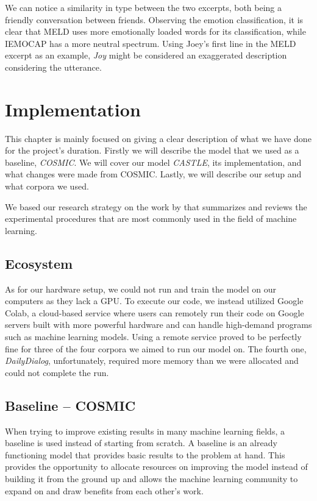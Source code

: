 \documentclass[nofilelist]{cslthse-msc}
\begin{document}
We can notice a similarity in type between the two excerpts, both being a friendly conversation between friends. Observing the emotion classification, it is clear that MELD uses more emotionally loaded words for its classification, while IEMOCAP has a more neutral spectrum. Using Joey's first line in the MELD excerpt as an example, \textit{Joy} might be considered an exaggerated description considering the utterance. 










\chapter{Implementation}
This chapter is mainly focused on giving a clear description of what we have done for the project's duration. Firstly we will describe the model that we used as a baseline, \textit{COSMIC}. We will cover our model \textit{CASTLE}, its implementation, and what changes were made from COSMIC. Lastly, we will describe our setup and what corpora we used. 

We based our research strategy on the work by \citet{bouthillier:hal-02447823} that summarizes and reviews the experimental procedures that are most commonly used in the field of machine learning.






\section{Ecosystem}
As for our hardware setup, we could not run and train the model on our computers as they lack a GPU. To execute our code, we instead utilized Google Colab, a cloud-based service where users can remotely run their code on Google servers built with more powerful hardware and can handle high-demand programs such as machine learning models. Using a remote service proved to be perfectly fine for three of the four corpora we aimed to run our model on. The fourth one, \textit{DailyDialog}, unfortunately, required more memory than we were allocated and could not complete the run.

\section{Baseline -- COSMIC}
\label{COSMIC_chapter}
When trying to improve existing results in many machine learning fields, a baseline is used instead of starting from scratch. A baseline is an already functioning model that provides basic results to the problem at hand. This provides the opportunity to allocate resources on improving the model instead of building it from the ground up and allows the machine learning community to expand on and draw benefits from each other's work. 
\end{document}
